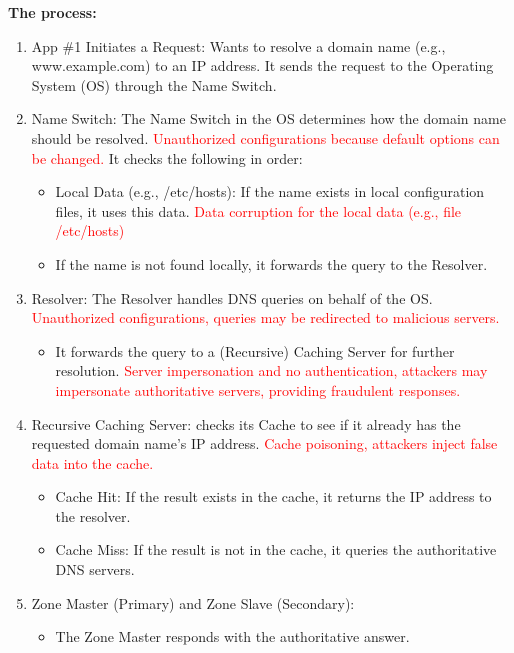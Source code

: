 \begin{center}
    \textbf{The process:}
\end{center}
\begin{enumerate}
    \item App \#1 Initiates a Request: Wants to resolve a domain name (e.g., www.example.com) to an IP address. It sends the request to the Operating System (OS) through the Name Switch.
    \item Name Switch: 	The Name Switch in the OS determines how the domain name should be resolved. \textcolor{Red}{Unauthorized configurations because default options can be changed.} It checks the following in order:
    \begin{itemize}
        \item Local Data (e.g., /etc/hosts): If the name exists in local configuration files, it uses this data. \textcolor{Red}{Data corruption for the local data (e.g., file /etc/hosts)}
        \item If the name is not found locally, it forwards the query to the Resolver.
    \end{itemize}
    \item Resolver: The Resolver handles DNS queries on behalf of the OS. \textcolor{Red}{Unauthorized configurations, queries may be redirected to malicious servers.}
    \begin{itemize}
        \item It forwards the query to a (Recursive) Caching Server for further resolution. \textcolor{Red}{Server impersonation and no authentication, attackers may impersonate authoritative servers, providing fraudulent responses.}
    \end{itemize} 
    \item Recursive Caching Server: checks its Cache to see if it already has the requested domain name’s IP address. \textcolor{Red}{Cache poisoning, attackers inject false data into the cache.}
    \begin{itemize}
        \item Cache Hit: If the result exists in the cache, it returns the IP address to the resolver.
        \item Cache Miss: If the result is not in the cache, it queries the authoritative DNS servers.
    \end{itemize}
    \item  Zone Master (Primary) and Zone Slave (Secondary):
    \begin{itemize}
        \item The Zone Master responds with the authoritative answer.

\end{itemize}
\end{enumerate}
